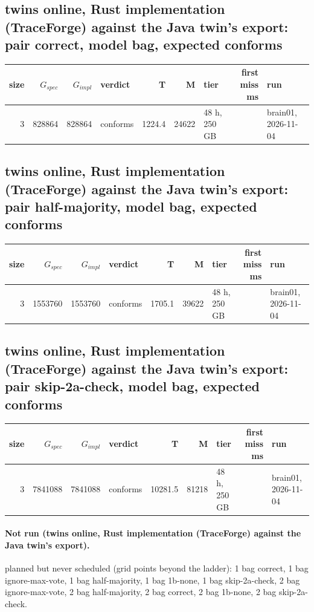 \documentclass[10pt]{article}
\begin{document}
\subsection*{twins online, Rust implementation (TraceForge) against the Java twin's export: pair \textsf{correct}, model bag, expected conforms}
\begin{longtable}{@{}rrrlrrlrl@{}}
\toprule
size & $G_{\mathit{spec}}$ & $G_{\mathit{impl}}$ & verdict & T & M & tier & first miss ms & run \\
\midrule
\endhead
\color{blue} 3 & 828864 & 828864 & conforms & 1224.4 & 24622 & 48 h, 250 GB &  & brain01, 2026-11-04 \\
\bottomrule
\end{longtable}
\subsection*{twins online, Rust implementation (TraceForge) against the Java twin's export: pair \textsf{half-majority}, model bag, expected conforms}
\begin{longtable}{@{}rrrlrrlrl@{}}
\toprule
size & $G_{\mathit{spec}}$ & $G_{\mathit{impl}}$ & verdict & T & M & tier & first miss ms & run \\
\midrule
\endhead
\color{blue} 3 & 1553760 & 1553760 & conforms & 1705.1 & 39622 & 48 h, 250 GB &  & brain01, 2026-11-04 \\
\bottomrule
\end{longtable}
\subsection*{twins online, Rust implementation (TraceForge) against the Java twin's export: pair \textsf{skip-2a-check}, model bag, expected conforms}
\begin{longtable}{@{}rrrlrrlrl@{}}
\toprule
size & $G_{\mathit{spec}}$ & $G_{\mathit{impl}}$ & verdict & T & M & tier & first miss ms & run \\
\midrule
\endhead
\color{blue} 3 & 7841088 & 7841088 & conforms & 10281.5 & 81218 & 48 h, 250 GB &  & brain01, 2026-11-04 \\
\bottomrule
\end{longtable}
\paragraph{Not run (twins online, Rust implementation (TraceForge) against the Java twin's export).}
planned but never scheduled (grid points beyond the ladder): 1 bag correct, 1 bag ignore-max-vote, 1 bag half-majority, 1 bag 1b-none, 1 bag skip-2a-check, 2 bag ignore-max-vote, 2 bag half-majority, 2 bag correct, 2 bag 1b-none, 2 bag skip-2a-check.\par
\end{document}
